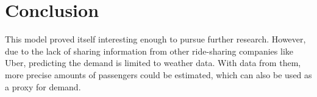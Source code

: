 \documentclass[11pt]{article}
\begin{document}

\section{Conclusion}

This model proved itself interesting enough to pursue further research. However, due to the lack of sharing information from other ride-sharing companies like Uber, predicting the demand is limited to weather data. With data from them, more precise amounts of passengers could be estimated, which can also be used as a proxy for demand.


\clearpage

\printbibliography
\end{document}
